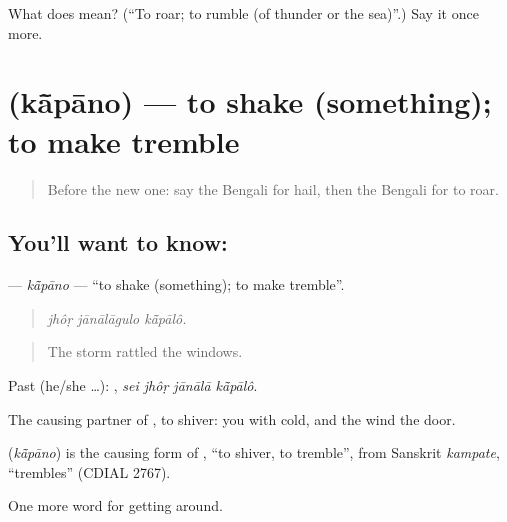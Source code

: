 \begin{tcolorbox}[breakable,colback=teal!4,colframe=teal!35!black,title={Before you move on}]
What does  mean? (\textquotedblleft{}To roar; to rumble (of thunder or the sea)\textquotedblright{}.) Say it once more.
\end{tcolorbox}
\section[\texorpdfstring{\bn{কাঁপানো} (kā̃pāno)}{কাঁপানো (kā̃pāno)}]{ (kā̃pāno) — to shake (something); to make tremble}

\label{lesson:BN-C429-kapano}



\begin{quote}
Before the new one: say the Bengali for hail, then the Bengali for to roar.
\end{quote}

\subsection*{You'll want to know: }
\textbf{} — \emph{kā̃pāno} — \textquotedblleft{}to shake (something); to make tremble\textquotedblright{}.

\begin{quote}
  
\end{quote}

\begin{quote}
\emph{jhôṛ jānālāgulo kā̃pālô.}
\end{quote}

\begin{quote}
The storm rattled the windows.
\end{quote}

Past (he/she …):    , \emph{sei jhôṛ jānālā kā̃pālô}.

The causing partner of , to shiver: you  with cold, and the wind  the door.

\begin{cousinweb}
\textbf{} (\emph{kā̃pāno}) is the causing form of \textbf{}, \textquotedblleft{}to shiver, to tremble\textquotedblright{}, from Sanskrit \emph{kampate}, \textquotedblleft{}trembles\textquotedblright{} (CDIAL 2767).
\end{cousinweb}

\begin{grammarlens}[title={What you've built}]
One more word for getting around.
\end{grammarlens}

